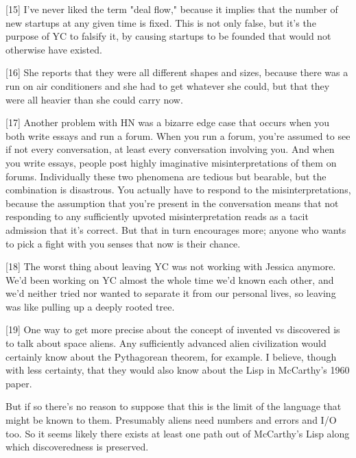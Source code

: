 [15] I've never liked the term "deal flow," because it implies
                  that the number of new startups at any given time is fixed.
                  This is not only false, but it's the purpose of YC to falsify
                  it, by causing startups to be founded that would not otherwise
                  have existed.

[16] She reports that they were all different shapes and sizes,
                  because there was a run on air conditioners and she had to get
                  whatever she could, but that they were all heavier than she
                  could carry now.

[17] Another problem with HN was a bizarre edge case that occurs
                  when you both write essays and run a forum. When you run a
                  forum, you're assumed to see if not every conversation, at
                  least every conversation involving you. And when you write
                  essays, people post highly imaginative misinterpretations of
                  them on forums. Individually these two phenomena are tedious
                  but bearable, but the combination is disastrous. You actually
                  have to respond to the misinterpretations, because the
                  assumption that you're present in the conversation means that
                  not responding to any sufficiently upvoted misinterpretation
                  reads as a tacit admission that it's correct. But that in turn
                  encourages more; anyone who wants to pick a fight with you
                  senses that now is their chance.

[18] The worst thing about leaving YC was not working with
                  Jessica anymore. We'd been working on YC almost the whole time
                  we'd known each other, and we'd neither tried nor wanted to
                  separate it from our personal lives, so leaving was like
                  pulling up a deeply rooted tree.

[19] One way to get more precise about the concept of invented
                  vs discovered is to talk about space aliens. Any sufficiently
                  advanced alien civilization would certainly know about the
                  Pythagorean theorem, for example. I believe, though with less
                  certainty, that they would also know about the Lisp in
                  McCarthy's 1960 paper.

But if so there's no reason
                  to suppose that this is the limit of the language that might
                  be known to them. Presumably aliens need numbers and errors
                  and I/O too. So it seems likely there exists at least one path
                  out of McCarthy's Lisp along which discoveredness is
                  preserved.



